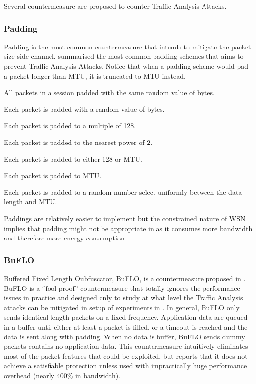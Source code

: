 Several countermeasure are proposed to counter Traffic Analysis Attacks. 

\subsubsection{Padding}

Padding is the most common countermeasure that intends to mitigate the packet size side channel. \cite{Peekaboo} summarised the most common padding schemes that aims to prevent Traffic Analysis Attacks. Notice that when a padding scheme would pad a packet longer than MTU, it is truncated to MTU instead.

\begin{description}[style=nextline]
	\item[Session Random Padding] 
	All packets in a session padded with the same random value of bytes.
	\item[Packet Random Padding]
	Each packet is padded with a random value of bytes.
	\item[Linear Padding]
	Each packet is padded to a multiple of 128.
	\item[Exponential Padding]
	Each packet is padded to the nearest power of 2.
	\item[Mice-Elephants Padding]
	Each packet is padded to either 128 or MTU.
	\item[Pad to MTU]
	Each packet is padded to MTU.
	\item[Packet Random MTU Padding]
	Each packet is padded to a random number select uniformly between the data length and MTU.
\end{description}

Paddings are relatively easier to implement but the constrained nature of WSN implies that padding might not be appropriate in as it consumes more bandwidth and therefore more energy consumption.

\subsubsection{BuFLO}

Buffered Fixed Length Oubfuscator, BuFLO, is a countermeasure proposed in \cite{Peekaboo}. BuFLO is a ``fool-proof''\cite{Peekaboo} countermeasure that totally ignores the performance issues in practice and designed only to study at what level the Traffic Analysis attacks can be mitigated in setup of experiments in \cite{Peekaboo}. In general, BuFLO only sends identical length packets on a fixed frequency. Application data are queued in a buffer until either at least a packet is filled, or a timeout is reached and the data is sent along with padding. When no data is buffer, BuFLO sends dummy packets contains no application data. This countermeasure intuitively eliminates most of the packet features that could be exploited, but \cite{Peekaboo} reports that it does not achieve a satisfiable protection unless used with impractically huge performance  overhead (nearly 400\% in bandwidth).

